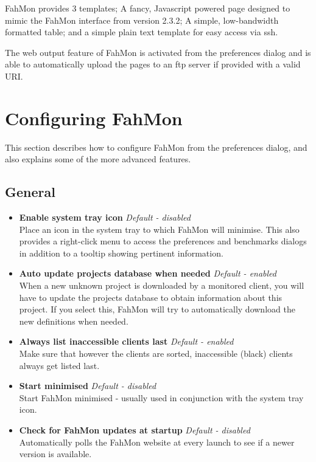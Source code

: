 FahMon provides 3 templates; A fancy, Javascript powered page designed to mimic
the FahMon interface from version 2.3.2; A simple, low-bandwidth formatted
table; and a simple plain text template for easy access via ssh.

The web output feature of FahMon is activated from the preferences dialog and is
able to automatically upload the pages to an ftp server if provided with a valid
URI.

\section{Configuring FahMon}

This section describes how to configure FahMon from the preferences dialog, and
also explains some of the more advanced features.

\subsection{General}
\begin{itemize}
 \item \textbf{Enable system tray icon} \textit{Default - disabled}
  \\Place an icon in the system tray to which FahMon will minimise. This also
   provides a right-click menu to access the preferences and benchmarks dialogs
   in addition to a tooltip showing pertinent information.
 \item \textbf{Auto update projects database when needed} \textit{Default -
   enabled}
  \\When a new unknown project is downloaded by a monitored client, you will
   have to update the projects database to obtain information about this
   project. If you select this, FahMon will try to automatically download the
   new definitions when needed.
 \item \textbf{Always list inaccessible clients last} \textit{Default - enabled}
  \\Make sure that however the clients are sorted, inaccessible (black) clients
   always get listed last.
 \item \textbf{Start minimised} \textit{Default - disabled}
  \\Start FahMon minimised - usually used in conjunction with the system tray
   icon.
 \item \textbf{Check for FahMon updates at startup} \textit{Default - disabled}
  \\Automatically polls the FahMon website at every launch to see if a newer
   version is available.
\end{itemize}

